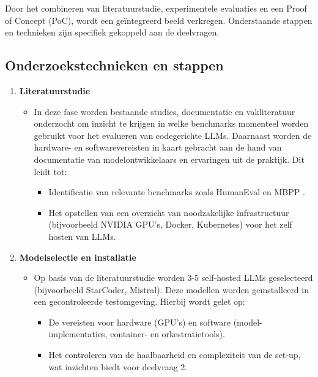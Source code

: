 Door het combineren van literatuurstudie, experimentele evaluaties en een Proof of Concept (PoC), wordt een geïntegreerd beeld verkregen. Onderstaande stappen en technieken zijn specifiek gekoppeld aan de deelvragen.

\subsection{Onderzoekstechnieken en stappen}

\begin{enumerate}
    \item \textbf{Literatuurstudie}
    \begin{itemize}
        \item In deze fase worden bestaande studies, documentatie en vakliteratuur onderzocht om inzicht te krijgen in welke benchmarks momenteel worden gebruikt voor het evalueren van codegerichte LLMs. Daarnaast worden de hardware- en softwarevereisten in kaart gebracht aan de hand van documentatie van modelontwikkelaars en ervaringen uit de praktijk. Dit leidt tot:
        \begin{itemize}
            \item Identificatie van relevante benchmarks zoals HumanEval en MBPP \autocite{Chen2021}.
            \item Het opstellen van een overzicht van noodzakelijke infrastructuur (bijvoorbeeld NVIDIA GPU’s, Docker, Kubernetes) voor het zelf hosten van LLMs.
        \end{itemize}
    \end{itemize}

    \item \textbf{Modelselectie en installatie}
    \begin{itemize}
        \item Op basis van de literatuurstudie worden 3-5 self-hosted LLMs geselecteerd (bijvoorbeeld StarCoder, Mistral). Deze modellen worden geïnstalleerd in een gecontroleerde testomgeving. Hierbij wordt gelet op:
        \begin{itemize}
            \item De vereisten voor hardware (GPU’s) en software (model-implementaties, container- en orkestratietools).
            \item Het controleren van de haalbaarheid en complexiteit van de set-up, wat inzichten biedt voor deelvraag 2.
        \end{itemize}
    \end{itemize}


\end{enumerate}
